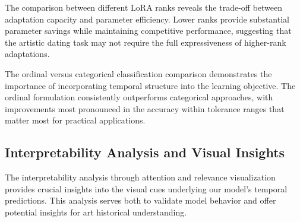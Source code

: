 \documentclass[10pt,twocolumn,letterpaper]{article}
\begin{document}
The comparison between different LoRA ranks reveals the trade-off between adaptation capacity and parameter efficiency. Lower ranks provide substantial parameter savings while maintaining competitive performance, suggesting that the artistic dating task may not require the full expressiveness of higher-rank adaptations.

The ordinal versus categorical classification comparison demonstrates the importance of incorporating temporal structure into the learning objective. The ordinal formulation consistently outperforms categorical approaches, with improvements most pronounced in the accuracy within tolerance ranges that matter most for practical applications.

\subsection{Interpretability Analysis and Visual Insights}

The interpretability analysis through attention and relevance visualization provides crucial insights into the visual cues underlying our model's temporal predictions. This analysis serves both to validate model behavior and offer potential insights for art historical understanding.

\end{document}
